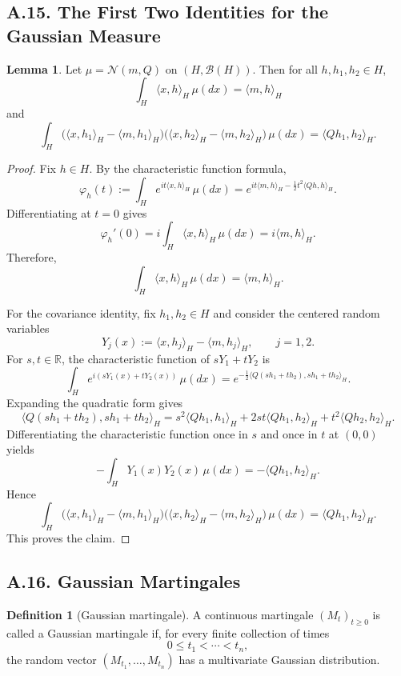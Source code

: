 \documentclass[11pt]{article}
\theoremstyle{definition}
\newtheorem{definition}{Definition}
\newtheorem{lemma}{Lemma}
\theoremstyle{remark}
\begin{document}
\subsection*{A.15. The First Two Identities for the Gaussian Measure}
\begin{lemma}
Let $\mu=\mathcal N(m,Q)$ on $(H,\mathcal B(H))$. Then for all $h,h_1,h_2\in H$,
\[
\int_H \langle x,h\rangle_H\,\mu(dx)=\langle m,h\rangle_H
\]
and
\[
\int_H
\bigl(\langle x,h_1\rangle_H-\langle m,h_1\rangle_H\bigr)
\bigl(\langle x,h_2\rangle_H-\langle m,h_2\rangle_H\bigr)\,\mu(dx)
=
\langle Qh_1,h_2\rangle_H.
\]
\end{lemma}

\begin{proof}
Fix $h\in H$. By the characteristic function formula,
\[
\varphi_h(t):=\int_H e^{it\langle x,h\rangle_H}\,\mu(dx)
=
e^{it\langle m,h\rangle_H-\frac12 t^2\langle Qh,h\rangle_H}.
\]
Differentiating at $t=0$ gives
\[
\varphi_h'(0)
=
i\int_H \langle x,h\rangle_H\,\mu(dx)
=
i\langle m,h\rangle_H.
\]
Therefore,
\[
\int_H \langle x,h\rangle_H\,\mu(dx)=\langle m,h\rangle_H.
\]

For the covariance identity, fix $h_1,h_2\in H$ and consider the centered random variables
\[
Y_j(x):=\langle x,h_j\rangle_H-\langle m,h_j\rangle_H,
\qquad j=1,2.
\]
For $s,t\in\mathbb R$, the characteristic function of $sY_1+tY_2$ is
\[
\int_H e^{i(sY_1(x)+tY_2(x))}\,\mu(dx)
=
e^{-\frac12\langle Q(sh_1+th_2),sh_1+th_2\rangle_H}.
\]
Expanding the quadratic form gives
\[
\langle Q(sh_1+th_2),sh_1+th_2\rangle_H
=
s^2\langle Qh_1,h_1\rangle_H+2st\langle Qh_1,h_2\rangle_H+t^2\langle Qh_2,h_2\rangle_H.
\]
Differentiating the characteristic function once in $s$ and once in $t$ at $(0,0)$ yields
\[
-\int_H Y_1(x)Y_2(x)\,\mu(dx)=-\langle Qh_1,h_2\rangle_H.
\]
Hence
\[
\int_H
\bigl(\langle x,h_1\rangle_H-\langle m,h_1\rangle_H\bigr)
\bigl(\langle x,h_2\rangle_H-\langle m,h_2\rangle_H\bigr)\,\mu(dx)
=
\langle Qh_1,h_2\rangle_H.
\]
This proves the claim.
\end{proof}

\subsection*{A.16. Gaussian Martingales}
\begin{definition}[Gaussian martingale]
A continuous martingale $(M_t)_{t\ge 0}$ is called a Gaussian martingale if, for every finite collection of times
\[
0\le t_1<\cdots < t_n,
\]
the random vector \((M_{t_1},\dots,M_{t_n})\) has a multivariate Gaussian distribution.
\end{definition}
\end{document}
